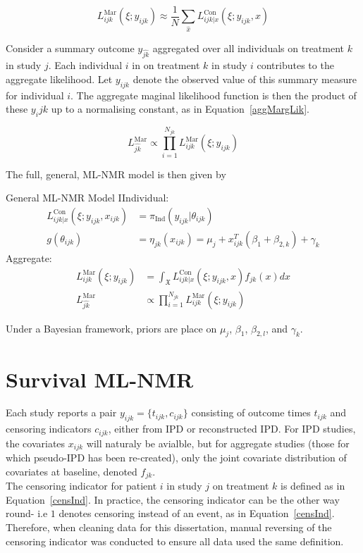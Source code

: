 \begin{equation}
    L_{ijk}^{\text{Mar}}(\xi; y_{ijk}) \approx \frac{1}{N}\sum_{\hat{x}}L_{ijk|x}^{\text{Con}}(\xi;y_{ijk},x)
    \label{eq:margApprox}
\end{equation}

Consider a summary outcome $y_{\hat{jk}}$ aggregated over all individuals on treatment $k$ in study $j$. Each individual $i$ in on treatment $k$ in study $i$ contributes to the aggregate likelihood. Let $y_{ijk}$ denote the observed value of this summary measure for individual $i$. The aggregate maginal likelihood function is then the product of these $y_ijk$ up to a normalising constant, as in Equation~\ref{aggMargLik}.

\begin{equation}
    L_{\hat{jk}}^{\text{Mar}} \propto \prod_{i = 1}^{N_{jk}}L_{ijk}^{\text{Mar}}(\xi; y_{ijk})
    \label{aggMargLik}
\end{equation}

The full, general, ML-NMR model is then given by 

\begin{definition}{General ML-NMR Model}
    IIndividual:
    \begin{align}
        L_{ijk|x}^{\text{Con}}(\xi;y_{ijk},x_{ijk}) &= \pi_{\text{Ind}}(y_{ijk}|\theta_{ijk}) \\
        g(\theta_{ijk}) &= \eta_{jk}(x_{ijk}) = \mu_j + x_{ijk}^T(\beta_1 + \beta_{2,k}) + \gamma_k \label{mlnmragg}
    \end{align}
    Aggregate:
    \begin{align}
        L_{ijk}^{\text{Mar}}(\xi; y_{ijk}) &= \int_{\mathfrak{X}} L_{ijk|x}^{\text{Con}}(\xi; y_{ijk}, x)f_{jk}(x)dx \label{mlnnmrint}\\
        L_{\hat{jk}}^{\text{Mar}} &\propto \prod_{i = 1}^{N_{jk}}L_{ijk}^{\text{Mar}}(\xi; y_{ijk})
    \end{align}
\end{definition}

Under a Bayesian framework, priors are place on $\mu_j$, $\beta_1$, $\beta_{2,l}$, and $\gamma_k$.

\section{Survival ML-NMR}
Each study reports a pair $y_{ijk} = \{t_{ijk}, c_{ijk}\}$ consisting of outcome times $t_{ijk}$ and censoring indicators $c_{ijk}$, either from IPD or reconstructed IPD. For IPD studies, the covariates $x_{ijk}$ will naturaly be avialble, but for aggregate studies (those for which pseudo-IPD has been re-created), only the joint covariate distribution of covariates at baseline, denoted $f_{jk}$. \\
The censoring indicator for patient $i$ in study $j$ on treatment $k$ is defined as in Equation~\ref{censInd}. In practice, the censoring indicator can be the other way round- i.e $1$ denotes censoring instead of an event, as in Equation~\ref{censInd}. Therefore, when cleaning data for this dissertation, manual reversing of the censoring indicator was conducted to ensure all data used the same definition.

